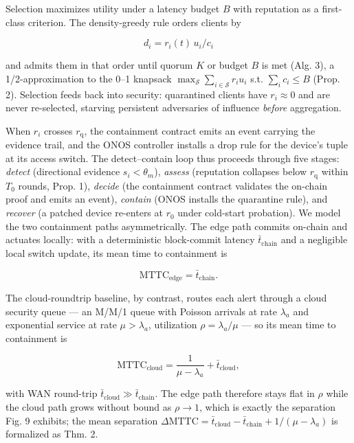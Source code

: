 \documentclass[cmc,article,submit,moreauthors,pdftex]{Definitions/tsp}
\begin{document}
Selection maximizes utility under a latency budget $B$ with reputation as a first-class criterion. The density-greedy rule orders clients by

\begin{equation}
d_i = r_i(t)\, u_i / c_i
\tag{11}
\end{equation}

and admits them in that order until quorum $K$ or budget $B$ is met (Alg. 3), a 1/2-approximation to the 0--1 knapsack $\max_{\mathcal{S}} \sum_{i \in \mathcal{S}} r_i u_i$ s.t. $\sum_i c_i \le B$ (Prop. 2). Selection feeds back into security: quarantined clients have $r_i \approx 0$ and are never re-selected, starving persistent adversaries of influence \emph{before} aggregation.

When $r_i$ crosses $r_{\mathrm{q}}$, the containment contract emits an event carrying the evidence trail, and the ONOS controller installs a drop rule for the device's tuple at its access switch. The detect--contain loop thus proceeds through five stages: \emph{detect} (directional evidence $s_i < \theta_m$), \emph{assess} (reputation collapses below $r_{\mathrm{q}}$ within $T_0$ rounds, Prop. 1), \emph{decide} (the containment contract validates the on-chain proof and emits an event), \emph{contain} (ONOS installs the quarantine rule), and \emph{recover} (a patched device re-enters at $r_0$ under cold-start probation). We model the two containment paths asymmetrically. The edge path commits on-chain and actuates locally: with a deterministic block-commit latency $\bar{t}_{\mathrm{chain}}$ and a negligible local switch update, its mean time to containment is

\begin{equation}
\mathrm{MTTC}_{\mathrm{edge}} = \bar{t}_{\mathrm{chain}}.
\tag{12}
\end{equation}

The cloud-roundtrip baseline, by contrast, routes each alert through a cloud security queue --- an M/M/1 queue with Poisson arrivals at rate $\lambda_a$ and exponential service at rate $\mu > \lambda_a$, utilization $\rho = \lambda_a/\mu$ --- so its mean time to containment is

\begin{equation}
\mathrm{MTTC}_{\mathrm{cloud}} = \frac{1}{\mu - \lambda_a} + \bar{t}_{\mathrm{cloud}},
\tag{13}
\end{equation}

with WAN round-trip $\bar{t}_{\mathrm{cloud}} \gg \bar{t}_{\mathrm{chain}}$. The edge path therefore stays flat in $\rho$ while the cloud path grows without bound as $\rho \to 1$, which is exactly the separation Fig. 9 exhibits; the mean separation $\Delta\mathrm{MTTC} = \bar{t}_{\mathrm{cloud}} - \bar{t}_{\mathrm{chain}} + 1/(\mu-\lambda_a)$ is formalized as Thm. 2.
\end{document}
